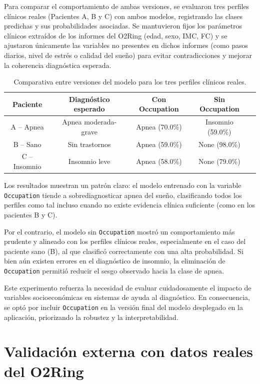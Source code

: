 Para comparar el comportamiento de ambas versiones, se evaluaron tres perfiles clínicos reales (Pacientes A, B y C) con ambos modelos, registrando las clases predichas y sus probabilidades asociadas. Se mantuvieron fijos los parámetros clínicos extraídos de los informes del O2Ring (edad, sexo, IMC, FC) y se ajustaron únicamente las variables no presentes en dichos informes (como pasos diarios, nivel de estrés o calidad del sueño) para evitar contradicciones y mejorar la coherencia diagnóstica esperada.

\begin{table}[H]
\centering
\begin{tabular}{|c|c|c|c|c|}
\hline
\textbf{Paciente} & \textbf{Diagnóstico esperado} & \textbf{Con Occupation} & \textbf{Sin Occupation} \\
\hline
A – Apnea & Apnea moderada-grave & Apnea (70.0\%) & Insomnio (59.0\%) \\
B – Sano & Sin trastornos & Apnea (59.0\%) & None (98.0\%) \\
C – Insomnio & Insomnio leve & Apnea (58.0\%) & None (79.0\%) \\
\hline
\end{tabular}
\caption{Comparativa entre versiones del modelo para los tres perfiles clínicos reales.}
\end{table}

Los resultados muestran un patrón claro: el modelo entrenado con la variable \texttt{Occupation} tiende a sobrediagnosticar apnea del sueño, clasificando todos los perfiles como tal incluso cuando no existe evidencia clínica suficiente (como en los pacientes B y C).

Por el contrario, el modelo sin \texttt{Occupation} mostró un comportamiento más prudente y alineado con los perfiles clínicos reales, especialmente en el caso del paciente sano (B), al que clasificó correctamente con una alta probabilidad. Si bien aún existen errores en el diagnóstico de insomnio, la eliminación de \texttt{Occupation} permitió reducir el sesgo observado hacia la clase de apnea.

Este experimento refuerza la necesidad de evaluar cuidadosamente el impacto de variables socioeconómicas en sistemas de ayuda al diagnóstico. En consecuencia, se optó por incluir \texttt{Occupation} en la versión final del modelo desplegado en la aplicación, priorizando la robustez y la interpretabilidad.


\section{Validación externa con datos reales del O2Ring}


